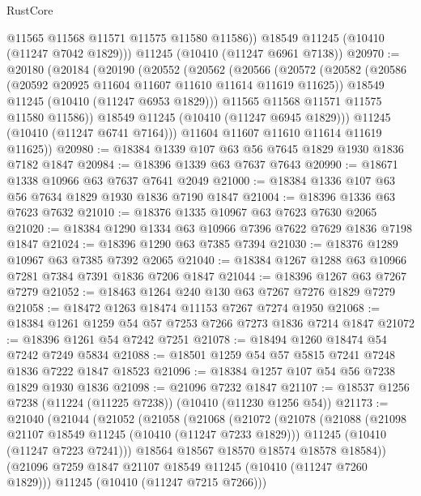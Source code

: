 \begin{lexlean}{RustCore}
\begin{coremodule}
          @11565
          @11568
          @11571
          @11575
          @11580
          @11586))
      @18549
      @11245
      (@10410 (@11247 @7042 @1829)))
    @11245
    (@10410 (@11247 @6961 @7138))
@20970 := @20180
    (@20184
      (@20190
        (@20552
          (@20562
            (@20566
              (@20572
                (@20582
                  (@20586 (@20592 @20925 @11604 @11607 @11610 @11614 @11619 @11625))
                  @18549
                  @11245
                  (@10410 (@11247 @6953 @1829)))
                @11565
                @11568
                @11571
                @11575
                @11580
                @11586))
            @18549
            @11245
            (@10410 (@11247 @6945 @1829)))
          @11245
          (@10410 (@11247 @6741 @7164)))
        @11604
        @11607
        @11610
        @11614
        @11619
        @11625))
@20980 := @18384 @1339 @107 @63 @56 @7645 @1829 @1930 @1836 @7182 @1847
@20984 := @18396 @1339 @63 @7637 @7643
@20990 := @18671 @1338 @10966 @63 @7637 @7641 @2049
@21000 := @18384 @1336 @107 @63 @56 @7634 @1829 @1930 @1836 @7190 @1847
@21004 := @18396 @1336 @63 @7623 @7632
@21010 := @18376 @1335 @10967 @63 @7623 @7630 @2065
@21020 := @18384 @1290 @1334 @63 @10966 @7396 @7622 @7629 @1836 @7198 @1847
@21024 := @18396 @1290 @63 @7385 @7394
@21030 := @18376 @1289 @10967 @63 @7385 @7392 @2065
@21040 := @18384 @1267 @1288 @63 @10966 @7281 @7384 @7391 @1836 @7206 @1847
@21044 := @18396 @1267 @63 @7267 @7279
@21052 := @18463 @1264 @240 @130 @63 @7267 @7276 @1829 @7279
@21058 := @18472 @1263 @18474 @11153 @7267 @7274 @1950
@21068 := @18384 @1261 @1259 @54 @57 @7253 @7266 @7273 @1836 @7214 @1847
@21072 := @18396 @1261 @54 @7242 @7251
@21078 := @18494 @1260 @18474 @54 @7242 @7249 @5834
@21088 := @18501 @1259 @54 @57 @5815 @7241 @7248 @1836 @7222 @1847 @18523
@21096 := @18384 @1257 @107 @54 @56 @7238 @1829 @1930 @1836
@21098 := @21096 @7232 @1847
@21107 := @18537 @1256 @7238 (@11224 (@11225 @7238)) (@10410 (@11230 @1256 @54))
@21173 := @21040
    (@21044
      (@21052
        (@21058
          (@21068
            (@21072
              (@21078
                (@21088
                  (@21098 @21107 @18549 @11245 (@10410 (@11247 @7233 @1829)))
                  @11245
                  (@10410 (@11247 @7223 @7241)))
                @18564
                @18567
                @18570
                @18574
                @18578
                @18584))
            (@21096 @7259 @1847 @21107 @18549 @11245 (@10410 (@11247 @7260 @1829)))
            @11245
            (@10410 (@11247 @7215 @7266)))

\end{coremodule}
\end{lexlean}
